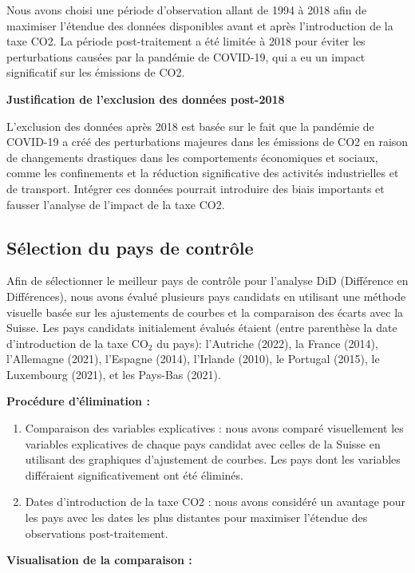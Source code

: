 Nous avons choisi une période d'observation allant de 1994 à 2018 afin de maximiser l'étendue des données disponibles avant et après l'introduction de la taxe CO2. La période post-traitement a été limitée à 2018 pour éviter les perturbations causées par la pandémie de COVID-19, qui a eu un impact significatif sur les émissions de CO2.

\textbf{Justification de l'exclusion des données post-2018}


L'exclusion des données après 2018 est basée sur le fait que la pandémie de COVID-19 a créé des perturbations majeures dans les émissions de CO2 en raison de changements drastiques dans les comportements économiques et sociaux, comme les confinements et la réduction significative des activités industrielles et de transport. Intégrer ces données pourrait introduire des biais importants et fausser l'analyse de l'impact de la taxe CO2.

\subsection{Sélection du pays de contrôle}
\label{subsec:control}

Afin de sélectionner le meilleur pays de contrôle pour l'analyse DiD (Différence en Différences), nous avons évalué plusieurs pays candidats en utilisant une méthode visuelle basée sur les ajustements de courbes et la comparaison des écarts avec la Suisse. Les pays candidats initialement évalués étaient (entre parenthèse la date d'introduction de la taxe CO$_2$ du pays): l'Autriche (2022), la France (2014), l'Allemagne (2021), l'Espagne (2014), l'Irlande (2010), le Portugal (2015), le Luxembourg (2021), et les Pays-Bas (2021).

\textbf{Procédure d'élimination :}

\begin{enumerate}
    \item Comparaison des variables explicatives : nous avons comparé visuellement les variables explicatives de chaque pays candidat avec celles de la Suisse en utilisant des graphiques d'ajustement de courbes. Les pays dont les variables différaient significativement ont été éliminés.
\item Dates d'introduction de la taxe CO2 : nous avons considéré un avantage pour les pays avec les dates les plus distantes pour maximiser l'étendue des observations post-traitement.
\end{enumerate}

\textbf{Visualisation de la comparaison :}


